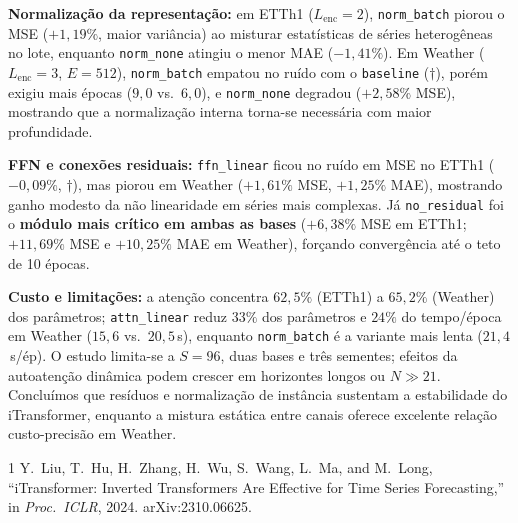 \documentclass[conference]{IEEEtran}
\begin{document}
\textbf{Normalização da representação:} em ETTh1 ($L_{\text{enc}}{=}2$), \texttt{norm\_batch} piorou o MSE ($+1{,}19\%$, maior variância) ao misturar estatísticas de séries heterogêneas no lote, enquanto \texttt{norm\_none} atingiu o menor MAE ($-1{,}41\%$). Em Weather ($L_{\text{enc}}{=}3$, $E{=}512$), \texttt{norm\_batch} empatou no ruído com o \texttt{baseline} ($\dagger$), porém exigiu mais épocas ($9{,}0$ vs.\ $6{,}0$), e \texttt{norm\_none} degradou ($+2{,}58\%$ MSE), mostrando que a normalização interna torna-se necessária com maior profundidade.

\textbf{FFN e conexões residuais:} \texttt{ffn\_linear} ficou no ruído em MSE no ETTh1 ($-0{,}09\%$, $\dagger$), mas piorou em Weather ($+1{,}61\%$ MSE, $+1{,}25\%$ MAE), mostrando ganho modesto da não linearidade em séries mais complexas. Já \texttt{no\_residual} foi o \textbf{módulo mais crítico em ambas as bases} ($+6{,}38\%$ MSE em ETTh1; $+11{,}69\%$ MSE e $+10{,}25\%$ MAE em Weather), forçando convergência até o teto de 10 épocas.

\textbf{Custo e limitações:} a atenção concentra $62{,}5\%$ (ETTh1) a $65{,}2\%$ (Weather) dos parâmetros; \texttt{attn\_linear} reduz $33\%$ dos parâmetros e $24\%$ do tempo/época em Weather ($15{,}6$ vs.\ $20{,}5$\,s), enquanto \texttt{norm\_batch} é a variante mais lenta ($21{,}4$\,s/ép). O estudo limita-se a $S{=}96$, duas bases e três sementes; efeitos da autoatenção dinâmica podem crescer em horizontes longos ou $N \gg 21$. Concluímos que resíduos e normalização de instância sustentam a estabilidade do iTransformer, enquanto a mistura estática entre canais oferece excelente relação custo-precisão em Weather.

\begin{thebibliography}{1}
Y.~Liu, T.~Hu, H.~Zhang, H.~Wu, S.~Wang, L.~Ma, and M.~Long, ``iTransformer: Inverted Transformers Are Effective for Time Series Forecasting,'' in \emph{Proc.\ ICLR}, 2024. arXiv:2310.06625.
\end{thebibliography}
\end{document}
